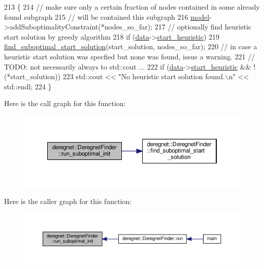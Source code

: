 \begin{DoxyCode}
213                                                                                            \{
214     \textcolor{comment}{// make sure only a certain fraction of nodes contained in some already found subgraph}
215     \textcolor{comment}{// will be contained this subgraph}
216     \hyperlink{classderegnet_1_1DeregnetFinder_ad922d8e38124b4c75daac29a928fcf5b}{model}->addSuboptimalityConstraint(*nodes\_so\_far);  
217     \textcolor{comment}{// optionally find heuristic start solution by greedy algorithm}
218     \textcolor{keywordflow}{if} (\hyperlink{classderegnet_1_1DeregnetFinder_ab158f2a6bb7f39ed3d6e4a9ffe568232}{data}->\hyperlink{classderegnet_1_1DeregnetData_abac721360704af5615f7ff84b183eebd}{start\_heuristic})
219         \hyperlink{classderegnet_1_1DeregnetFinder_a85fcde1dddbfd03ffc4ae8d244b4fc72}{find\_suboptimal\_start\_solution}(start\_solution, nodes\_so\_far);
220     \textcolor{comment}{// in case a heuristic start solution was specfied but none was found, issue a warning.}
221     \textcolor{comment}{// TODO: not necessarily always to std::cout ...}
222     \textcolor{keywordflow}{if} (\hyperlink{classderegnet_1_1DeregnetFinder_ab158f2a6bb7f39ed3d6e4a9ffe568232}{data}->\hyperlink{classderegnet_1_1DeregnetData_abac721360704af5615f7ff84b183eebd}{start\_heuristic} && !(*start\_solution))
223         std::cout << \textcolor{stringliteral}{"No heuristic start solution found.\(\backslash\)n"} << std::endl;
224 \}
\end{DoxyCode}
Here is the call graph for this function\+:\nopagebreak
\begin{figure}[H]
\begin{center}
\leavevmode
\includegraphics[width=350pt]{classderegnet_1_1DeregnetFinder_ad996cee997a5db4e09016a6f725a6701_cgraph}
\end{center}
\end{figure}
Here is the caller graph for this function\+:\nopagebreak
\begin{figure}[H]
\begin{center}
\leavevmode
\includegraphics[width=350pt]{classderegnet_1_1DeregnetFinder_ad996cee997a5db4e09016a6f725a6701_icgraph}
\end{center}
\end{figure}
